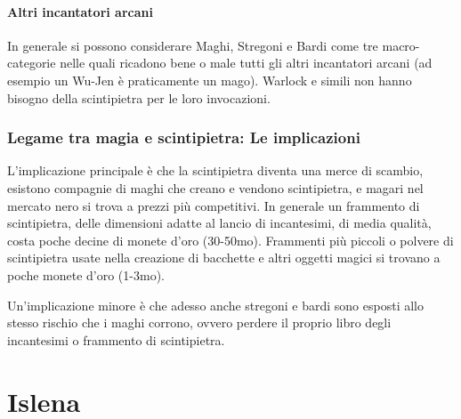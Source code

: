 \documentclass[10pt, a4paper]{report}
\newcommand{\partimagefile}{}
\newcommand{\partimage}[1]{%
	\renewcommand{\partimagefile}{#1}%
}
\begin{document}
\begin{multicols}{2}
\subsection*{Altri incantatori arcani}
In generale si possono considerare Maghi, Stregoni e Bardi come tre macro-categorie nelle quali ricadono bene o male tutti gli altri incantatori arcani (ad esempio un Wu-Jen è praticamente un mago). Warlock e simili non hanno bisogno della scintipietra per le loro invocazioni.

\section{Legame tra magia e scintipietra: Le implicazioni}
L'implicazione principale è che la scintipietra diventa una merce di scambio, esistono compagnie di maghi che creano e vendono scintipietra, e magari nel mercato nero si trova a prezzi più competitivi. In generale un frammento di scintipietra, delle dimensioni adatte al lancio di incantesimi, di media qualità, costa poche decine di monete d'oro (30-50mo). Frammenti più piccoli o polvere di scintipietra usate nella creazione di bacchette e altri oggetti magici si trovano a poche monete d'oro (1-3mo).

Un'implicazione minore è che adesso anche stregoni e bardi sono esposti allo stesso rischio che i maghi corrono, ovvero perdere il proprio libro degli incantesimi o frammento di scintipietra.


\end{multicols}

\partimage{islenapart.png}
\part{Islena}
\end{document}
